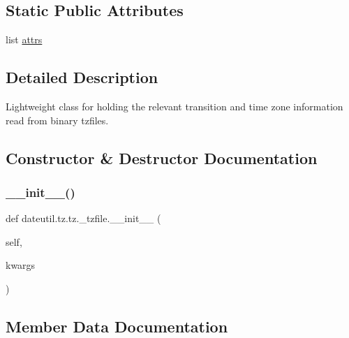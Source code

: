 \subsection*{Static Public Attributes}
\begin{DoxyCompactItemize}
\item 
list \hyperlink{classdateutil_1_1tz_1_1tz_1_1__tzfile_ad1f5241542bc7811863390ae488d07b4}{attrs}
\end{DoxyCompactItemize}


\subsection{Detailed Description}
\begin{DoxyVerb}Lightweight class for holding the relevant transition and time zone
information read from binary tzfiles.
\end{DoxyVerb}
 

\subsection{Constructor \& Destructor Documentation}
\mbox{\label{classdateutil_1_1tz_1_1tz_1_1__tzfile_ad940c6ee393611d013bba58074716b1d}} 
\subsubsection{\texorpdfstring{\+\_\+\+\_\+init\+\_\+\+\_\+()}{\_\_init\_\_()}}
{\footnotesize\ttfamily def dateutil.\+tz.\+tz.\+\_\+tzfile.\+\_\+\+\_\+init\+\_\+\+\_\+ (\begin{DoxyParamCaption}\item[{}]{self,  }\item[{}]{kwargs }\end{DoxyParamCaption})}



\subsection{Member Data Documentation}
\mbox{\label{classdateutil_1_1tz_1_1tz_1_1__tzfile_ad1f5241542bc7811863390ae488d07b4}} 

